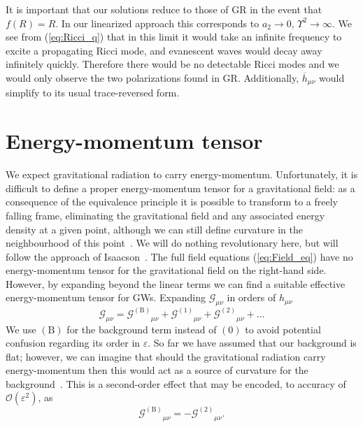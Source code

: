\documentclass[aps,prd,amsfonts,amssymb,amsmath,nofootinbib,reprint,showpacs]{revtex4-1}
\newcommand{\eqnref}[1]{(\ref{eq:#1})}
\newcommand{\order}[1]{\ensuremath{\mathcal{O}({#1})}}
\begin{document}
It is important that our solutions reduce to those of GR in the event that $f(R) = R$. In our linearized approach this corresponds to $a_2 \rightarrow 0$, $\Upsilon^2 \rightarrow \infty$. We see from \eqnref{Ricci_q} that in this limit it would take an infinite frequency to excite a propagating Ricci mode, and evanescent waves would decay away infinitely quickly. Therefore there would be no detectable Ricci modes and we would only observe the two polarizations found in GR. Additionally, $\overline{h}_{\mu\nu}$ would simplify to its usual trace-reversed form.

\section{Energy-momentum tensor\label{sec:EM_tensor}}

We expect gravitational radiation to carry energy-momentum. Unfortunately, it is difficult to define a proper energy-momentum tensor for a gravitational field: as a consequence of the equivalence principle it is possible to transform to a freely falling frame, eliminating the gravitational field and any associated energy density at a given point, although we can still define curvature in the neighbourhood of this point~\cite{Misner1973, Hobson2006}. We will do nothing revolutionary here, but will follow the approach of Isaacson~\cite{Isaacson1968, Isaacson1968a}. The full field equations \eqnref{Field_eq} have no energy-momentum tensor for the gravitational field on the right-hand side. However, by expanding beyond the linear terms we can find a suitable effective energy-momentum tensor for GWs. Expanding $\mathcal{G}_{\mu\nu}$ in orders of $h_{\mu\nu}$
\begin{equation}
\mathcal{G}_{\mu\nu} = {\mathcal{G}^{(\text{B})}}_{\mu\nu} + {\mathcal{G}^{(1)}}_{\mu\nu} + {\mathcal{G}^{(2)}}_{\mu\nu} + \ldots
\label{eq:G_exp}
\end{equation}
We use $(\text{B})$ for the background term instead of $(0)$ to avoid potential confusion regarding its order in $\varepsilon$. So far we have assumed that our background is flat; however, we can imagine that should the gravitational radiation carry energy-momentum then this would act as a source of curvature for the background~\cite{Wald1984}. This is a second-order effect that may be encoded, to accuracy of $\order{\varepsilon^2}$, as
\begin{equation}
{\mathcal{G}^{(\text{B})}}_{\mu\nu} = -{\mathcal{G}^{(2)}}_{\mu\nu}.
\end{equation}
\end{document}
